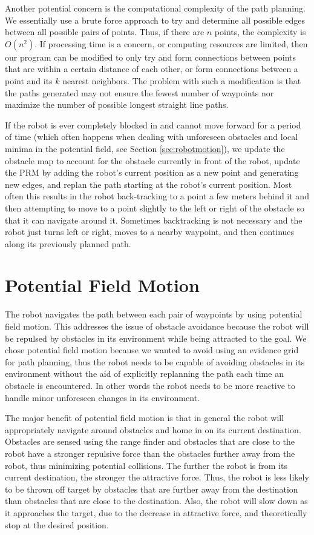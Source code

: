 \documentclass[12pt]{article}
\begin{document}
Another potential concern is the computational complexity of the path planning. We essentially use a brute force approach to try and determine all possible edges between all possible pairs of points. Thus, if there are $n$ points, the complexity is $O(n^2)$. If processing time is a concern, or computing resources are limited, then our program can be modified to only try and form connections between points that are within a certain distance of each other, or form connections between a point and its $k$ nearest neighbors. The problem with such a modification is that the paths generated may not ensure the fewest number of waypoints nor maximize the number of possible longest straight line paths.

If the robot is ever completely blocked in and cannot move forward for a period of time (which often happens when dealing with unforeseen obstacles and local minima in the potential field, see Section \ref{sec:robotmotion}), we update the obstacle map to account for the obstacle currently in front of the robot, update the PRM by adding the robot's current position as a new point and generating new edges, and replan the path starting at the robot's current position. Most often this results in the robot back-tracking to a point a few meters behind it and then attempting to move to a point slightly to the left or right of the obstacle so that it can navigate around it. Sometimes backtracking is not necessary and the robot just turns left or right, moves to a nearby waypoint, and then continues along its previously planned path.


\section{Potential Field Motion}
\label{sec:potential}

The robot navigates the path between each pair of waypoints by using potential field motion. This addresses the issue of obstacle avoidance because the robot will be repulsed by obstacles in its environment while being attracted to the goal. We chose potential field motion because we wanted to avoid using an evidence grid for path planning, thus the robot needs to be capable of avoiding obstacles in its environment without the aid of explicitly replanning the path each time an obstacle is encountered. In other words the robot needs to be more reactive to handle minor unforeseen changes in its environment.

The major benefit of potential field motion is that in general the robot will appropriately navigate around obstacles and home in on its current destination. Obstacles are sensed using the range finder and obstacles that are close to the robot have a stronger repulsive force than the obstacles further away from the robot, thus minimizing potential collisions. The further the robot is from its current destination, the stronger the attractive force. Thus, the robot is less likely to be thrown off target by obstacles that are further away from the destination than obstacles that are close to the destination. Also, the robot will slow down as it approaches the target, due to the decrease in attractive force, and theoretically stop at the desired position. 
\end{document}
